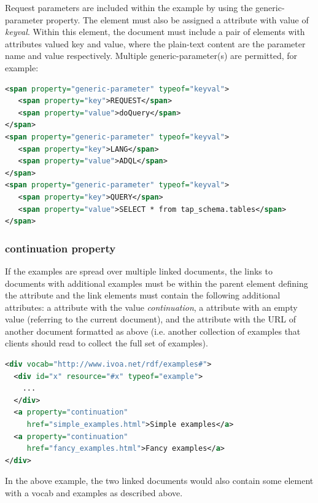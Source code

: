 \documentclass[11pt,letter]{ivoa}
\begin{document}
Request parameters are included within the example by using the 
generic-parameter property. The element must also be assigned a
 attribute 
with value of \emph{keyval}. Within this element, the document must include a pair of 
elements with  attributes valued key and value, where the plain-text content are 
the parameter name and value respectively. Multiple generic-parameter(s) are 
permitted, for example:

\begin{lstlisting}[language=XML]
<span property="generic-parameter" typeof="keyval">
   <span property="key">REQUEST</span>
   <span property="value">doQuery</span>
</span>
<span property="generic-parameter" typeof="keyval">
   <span property="key">LANG</span>
   <span property="value">ADQL</span>
</span>
<span property="generic-parameter" typeof="keyval">
   <span property="key">QUERY</span>
   <span property="value">SELECT * from tap_schema.tables</span>
</span>
\end{lstlisting}

\subsubsection{continuation property}

If the examples are spread over multiple linked documents, the links to 
documents with additional examples must be within the parent element defining 
the  attribute and the link elements must contain the following additional 
attributes:  a  attribute with the value
\emph{continuation}, a 
attribute with an empty value (referring to the current document), and
the 
attribute with the URL of another document formatted as above (i.e. another 
collection of examples that clients should read to collect the full set of 
examples).

\begin{lstlisting}[language=XML,basicstyle=\footnotesize]
<div vocab="http://www.ivoa.net/rdf/examples#">
  <div id="x" resource="#x" typeof="example">
    ...
  </div>
  <a property="continuation"
     href="simple_examples.html">Simple examples</a>
  <a property="continuation"
     href="fancy_examples.html">Fancy examples</a>
</div>
\end{lstlisting}

In the above example, the two linked documents would also contain some element 
with a vocab and examples as described above. 
\end{document}
